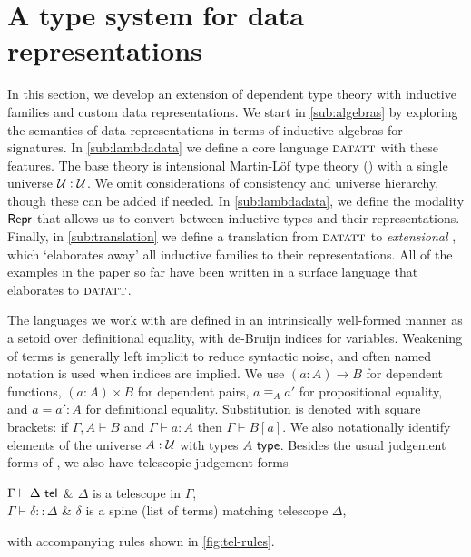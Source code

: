 \section{A type system for data representations}\label{sec:type-system}

In this section, we develop an extension of dependent type theory with inductive
families and custom data representations. We start in \cref{sub:algebras} by
exploring the semantics of data representations in terms of inductive algebras
for signatures. In \cref{sub:lambdadata} we define a core language ${\textsc{datatt}}$
with these features. The base theory is intensional Martin-L\"of type theory
(\lambdamltt) \cite{Martin-Lof1984-pz} with a single universe $\mathcal{U} : \mathcal{U}$.
We omit considerations of consistency and universe hierarchy, though these can
be added if needed. In \cref{sub:lambdadata}, we define the modality $\textsf{Repr}$
that allows us to convert between inductive types and their representations.
Finally, in \cref{sub:translation} we define a translation from ${\textsc{datatt}}$ to
\emph{extensional} \lambdamltt, which `elaborates away' all inductive families
to their representations. All of the examples in the paper so far have been
written in a surface language that elaborates to ${\textsc{datatt}}$.

The languages we work with are defined in an intrinsically well-formed manner \cite{Altenkirch2016-zc}
as a setoid over definitional equality, with de-Bruijn
indices for variables. Weakening of terms is generally left implicit to reduce
syntactic noise, and often named notation is used when indices are
implied. We use $(a : A) \to B$ for dependent functions, $(a : A) \times B$ for
dependent pairs, $a \equiv_A a'$ for propositional equality, and $a = a' : A$
for definitional equality. Substitution is denoted with square brackets: if
$\Gamma, A \vdash B$ and $\Gamma \vdash a : A$ then $\Gamma \vdash B[a]$. We
also notationally identify elements of the universe $A : \mathcal{U}$ with types $A
\ \textsf{type}$.
Besides the
usual judgement forms of \lambdamltt, we also have telescopic judgement forms
\begin{definitions}
$\Gamma \vdash \Delta \ \textsf{tel}$                & $\Delta$ is a telescope in $\Gamma$, \\
$\Gamma \vdash \delta :: \Delta$           & $\delta$ is a spine (list of terms) matching telescope $\Delta$,
\end{definitions}
with accompanying rules shown in \cref{fig:tel-rules}.

